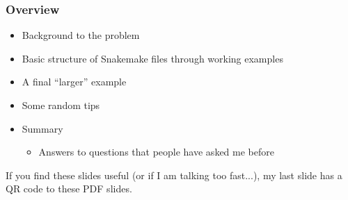 \begin{frame}

\frametitle{Overview}

\begin{itemize}
  \item Background to the problem
  \item Basic structure of Snakemake files through working examples
  \item A final ``larger'' example
  \item Some random tips
  \item Summary
    \begin{itemize}
      \item Answers to questions that people have asked me before
    \end{itemize}
\end{itemize}
\vs

If you find these slides useful (or if I am talking too fast...), my last slide has a QR code to these PDF slides.

\end{frame}


